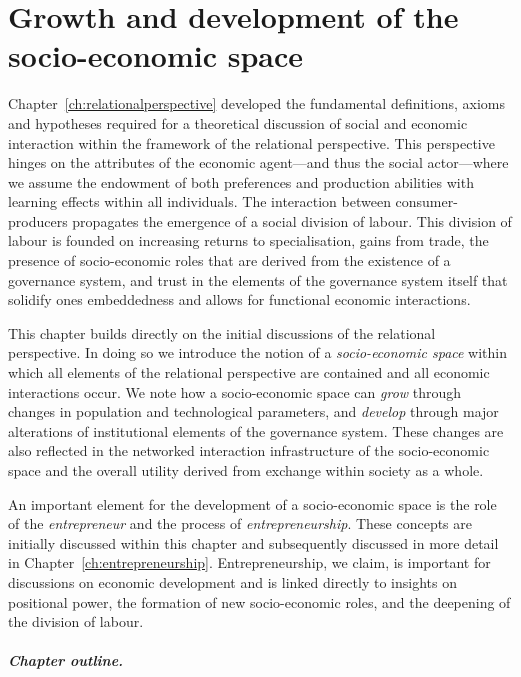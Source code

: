 \chapter{Growth and development of the socio-economic space}
\label{ch:relationaltheory}

Chapter~\ref{ch:relationalperspective} developed the fundamental definitions, axioms and hypotheses required for a theoretical discussion of social and economic interaction within the framework of the relational perspective. This perspective hinges on the attributes of the economic agent---and thus the social actor---where we assume the endowment of both preferences and production abilities with learning effects within all individuals. The interaction between consumer-producers propagates the emergence of a social division of labour. This division of labour is founded on increasing returns to specialisation, gains from trade, the presence of socio-economic roles that are derived from the existence of a governance system, and trust in the elements of the governance system itself that solidify ones embeddedness and allows for functional economic interactions.

This chapter builds directly on the initial discussions of the relational perspective. In doing so we introduce the notion of a \emph{socio-economic space} within which all elements of the relational perspective are contained and all economic interactions occur. We note how a socio-economic space can \emph{grow} through changes in population and technological parameters, and \emph{develop} through major alterations of institutional elements of the governance system. These changes are also reflected in the networked interaction infrastructure of the socio-economic space and the overall utility derived from exchange within society as a whole.

An important element for the development of a socio-economic space is the role of the \emph{entrepreneur} and the process of \emph{entrepreneurship}. These concepts are initially discussed within this chapter and subsequently discussed in more detail in Chapter~\ref{ch:entrepreneurship}. Entrepreneurship, we claim, is important for discussions on economic development and is linked directly to insights on positional power, the formation of new socio-economic roles, and the deepening of the division of labour.

\paragraph{Chapter outline.}

